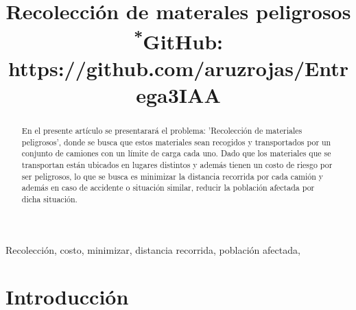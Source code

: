 \documentclass[conference]{IEEEtran}
\begin{document}
\title{Recolecci\'on de materales peligrosos\\
{\footnotesize \textsuperscript{*}GitHub: https://github.com/aruzrojas/Entrega3IAA}
}

\author{

}

\maketitle

\begin{abstract}

En el presente art\'iculo se presentarar\'a el problema: 'Recolecci\'on de materiales peligrosos', donde se busca que estos materiales sean recogidos y transportados por un conjunto de camiones con un límite de carga cada uno. Dado que los materiales que se transportan est\'an ubicados en lugares distintos y adem\'as tienen un costo de riesgo por ser peligrosos, lo que se busca es minimizar la distancia recorrida por cada camión y además en caso de accidente o situación similar, reducir la población afectada por dicha situación.

\end{abstract}

\begin{IEEEkeywords}
Recolecci\'on, costo, minimizar, distancia recorrida, poblaci\'on afectada,
\end{IEEEkeywords}

\section{Introducci\'on}
\end{document}
